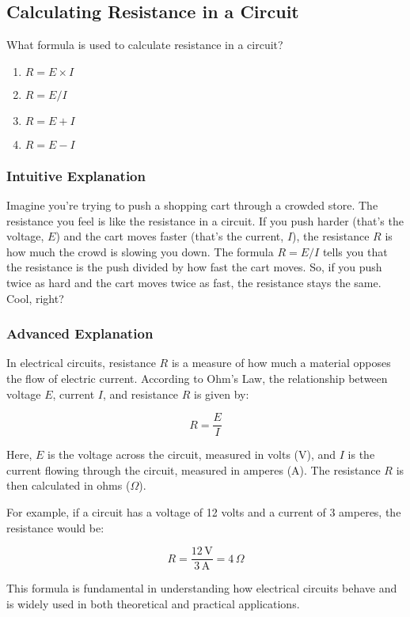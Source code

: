\subsection{Calculating Resistance in a Circuit}
\label{T5D03}

\begin{tcolorbox}[colback=gray!10!white,colframe=black!75!black,title=T5D03]
What formula is used to calculate resistance in a circuit?
\begin{enumerate}[label=\Alph*)]
    \item \( R = E \times I \)
    \item \textbf{\( R = E / I \)}
    \item \( R = E + I \)
    \item \( R = E - I \)
\end{enumerate}
\end{tcolorbox}

\subsubsection{Intuitive Explanation}
Imagine you're trying to push a shopping cart through a crowded store. The resistance you feel is like the resistance in a circuit. If you push harder (that's the voltage, \( E \)) and the cart moves faster (that's the current, \( I \)), the resistance \( R \) is how much the crowd is slowing you down. The formula \( R = E / I \) tells you that the resistance is the push divided by how fast the cart moves. So, if you push twice as hard and the cart moves twice as fast, the resistance stays the same. Cool, right?

\subsubsection{Advanced Explanation}
In electrical circuits, resistance \( R \) is a measure of how much a material opposes the flow of electric current. According to Ohm's Law, the relationship between voltage \( E \), current \( I \), and resistance \( R \) is given by:

\[
R = \frac{E}{I}
\]

Here, \( E \) is the voltage across the circuit, measured in volts (V), and \( I \) is the current flowing through the circuit, measured in amperes (A). The resistance \( R \) is then calculated in ohms (\(\Omega\)).

For example, if a circuit has a voltage of 12 volts and a current of 3 amperes, the resistance would be:

\[
R = \frac{12\, \text{V}}{3\, \text{A}} = 4\, \Omega
\]

This formula is fundamental in understanding how electrical circuits behave and is widely used in both theoretical and practical applications.

